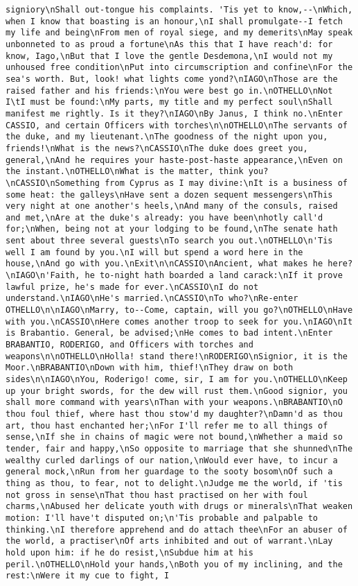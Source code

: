 \begin{verbatim}
signiory\nShall out-tongue his complaints. 'Tis yet to know,--\nWhich, when I know that boasting is an honour,\nI shall promulgate--I fetch my life and being\nFrom men of royal siege, and my demerits\nMay speak unbonneted to as proud a fortune\nAs this that I have reach'd: for know, Iago,\nBut that I love the gentle Desdemona,\nI would not my unhoused free condition\nPut into circumscription and confine\nFor the sea's worth. But, look! what lights come yond?\nIAGO\nThose are the raised father and his friends:\nYou were best go in.\nOTHELLO\nNot I\tI must be found:\nMy parts, my title and my perfect soul\nShall manifest me rightly. Is it they?\nIAGO\nBy Janus, I think no.\nEnter CASSIO, and certain Officers with torches\n\nOTHELLO\nThe servants of the duke, and my lieutenant.\nThe goodness of the night upon you, friends!\nWhat is the news?\nCASSIO\nThe duke does greet you, general,\nAnd he requires your haste-post-haste appearance,\nEven on the instant.\nOTHELLO\nWhat is the matter, think you?\nCASSIO\nSomething from Cyprus as I may divine:\nIt is a business of some heat: the galleys\nHave sent a dozen sequent messengers\nThis very night at one another's heels,\nAnd many of the consuls, raised and met,\nAre at the duke's already: you have been\nhotly call'd for;\nWhen, being not at your lodging to be found,\nThe senate hath sent about three several guests\nTo search you out.\nOTHELLO\n'Tis well I am found by you.\nI will but spend a word here in the house,\nAnd go with you.\nExit\n\nCASSIO\nAncient, what makes he here?\nIAGO\n'Faith, he to-night hath boarded a land carack:\nIf it prove lawful prize, he's made for ever.\nCASSIO\nI do not understand.\nIAGO\nHe's married.\nCASSIO\nTo who?\nRe-enter OTHELLO\n\nIAGO\nMarry, to--Come, captain, will you go?\nOTHELLO\nHave with you.\nCASSIO\nHere comes another troop to seek for you.\nIAGO\nIt is Brabantio. General, be advised;\nHe comes to bad intent.\nEnter BRABANTIO, RODERIGO, and Officers with torches and weapons\n\nOTHELLO\nHolla! stand there!\nRODERIGO\nSignior, it is the Moor.\nBRABANTIO\nDown with him, thief!\nThey draw on both sides\n\nIAGO\nYou, Roderigo! come, sir, I am for you.\nOTHELLO\nKeep up your bright swords, for the dew will rust them.\nGood signior, you shall more command with years\nThan with your weapons.\nBRABANTIO\nO thou foul thief, where hast thou stow'd my daughter?\nDamn'd as thou art, thou hast enchanted her;\nFor I'll refer me to all things of sense,\nIf she in chains of magic were not bound,\nWhether a maid so tender, fair and happy,\nSo opposite to marriage that she shunned\nThe wealthy curled darlings of our nation,\nWould ever have, to incur a general mock,\nRun from her guardage to the sooty bosom\nOf such a thing as thou, to fear, not to delight.\nJudge me the world, if 'tis not gross in sense\nThat thou hast practised on her with foul charms,\nAbused her delicate youth with drugs or minerals\nThat weaken motion: I'll have't disputed on;\n'Tis probable and palpable to thinking.\nI therefore apprehend and do attach thee\nFor an abuser of the world, a practiser\nOf arts inhibited and out of warrant.\nLay hold upon him: if he do resist,\nSubdue him at his peril.\nOTHELLO\nHold your hands,\nBoth you of my inclining, and the rest:\nWere it my cue to fight, I 
\end{verbatim}
